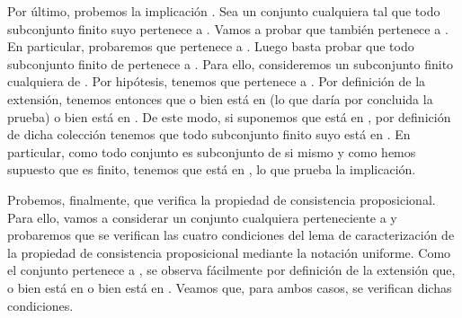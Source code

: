 \begin{isabellebody}
\begin{isamarkuptext}
\begin{demostracion}
   Por último, probemos la implicación . Sea un conjunto cualquiera  tal que todo
   subconjunto finito suyo pertenece a . Vamos a probar que  también pertenece a . En
   particular, probaremos que pertenece a . Luego basta probar que todo subconjunto finito de 
    pertenece a . Para ello, consideremos  un subconjunto finito cualquiera de . Por
   hipótesis, tenemos que  pertenece a . Por definición de la extensión, tenemos entonces
   que o bien  está en  (lo que daría por concluida la prueba) o bien  está en . 
   De este modo, si suponemos que  está en , por definición de dicha colección tenemos que
   todo subconjunto finito suyo está en . En particular, como todo conjunto es subconjunto de si
   mismo y como hemos supuesto que  es finito, tenemos que  está en , lo que prueba la
   implicación.

   Probemos, finalmente, que  verifica la propiedad de consistencia proposicional. Para ello,
   vamos a considerar un conjunto cualquiera  perteneciente a  y probaremos que se verifican 
   las cuatro condiciones del lema de caracterización de la propiedad de consistencia proposicional
   mediante la notación uniforme. Como el conjunto  pertenece a , se observa fácilmente por
   definición de la extensión que, o bien  está en  o bien  está en . Veamos que, para 
   ambos casos, se verifican dichas condiciones.


\end{demostracion}
\end{isamarkuptext}
\end{isabellebody}
